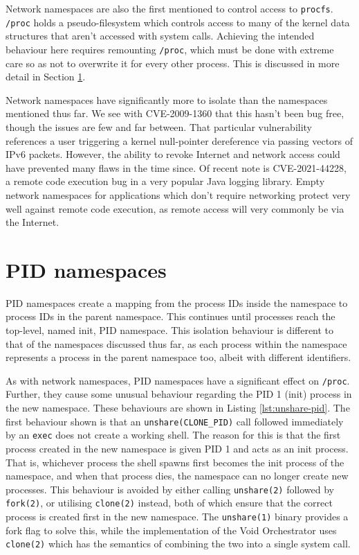 \documentclass[12pt,a4paper,twoside]{report}
\begin{document}
Network namespaces are also the first mentioned to control access to \texttt{procfs}. \texttt{/proc} holds a pseudo-filesystem which controls access to many of the kernel data structures that aren't accessed with system calls. Achieving the intended behaviour here requires remounting \texttt{/proc}, which must be done with extreme care so as not to overwrite it for every other process. This is discussed in more detail in Section \ref{sec:voiding-pid}.

Network namespaces have significantly more to isolate than the namespaces mentioned thus far. We see with CVE-2009-1360 that this hasn't been bug free, though the issues are few and far between. That particular vulnerability references a user triggering a kernel null-pointer dereference via passing vectors of IPv6 packets. However, the ability to revoke Internet and network access could have prevented many flaws in the time since. Of recent note is CVE-2021-44228, a remote code execution bug in a very popular Java logging library. Empty network namespaces for applications which don't require networking protect very well against remote code execution, as remote access will very commonly be via the Internet.

\section{PID namespaces}
\label{sec:voiding-pid}

PID namespaces create a mapping from the process IDs inside the namespace to process IDs in the parent namespace. This continues until processes reach the top-level, named init, PID namespace. This isolation behaviour is different to that of the namespaces discussed thus far, as each process within the namespace represents a process in the parent namespace too, albeit with different identifiers.

As with network namespaces, PID namespaces have a significant effect on \texttt{/proc}. Further, they cause some unusual behaviour regarding the PID 1 (init) process in the new namespace. These behaviours are shown in Listing \ref{lst:unshare-pid}. The first behaviour shown is that an \texttt{unshare(CLONE\_PID)} call followed immediately by an \texttt{exec} does not create a working shell. The reason for this is that the first process created in the new namespace is given PID 1 and acts as an init process. That is, whichever process the shell spawns first becomes the init process of the namespace, and when that process dies, the namespace can no longer create new processes. This behaviour is avoided by either calling \texttt{unshare(2)} followed by \texttt{fork(2)}, or utilising \texttt{clone(2)} instead, both of which ensure that the correct process is created first in the new namespace. The \texttt{unshare(1)} binary provides a fork flag to solve this, while the implementation of the Void Orchestrator uses \texttt{clone(2)} which has the semantics of combining the two into a single system call.
\end{document}
